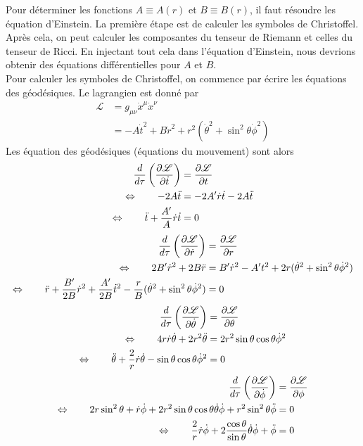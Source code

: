 \documentclass[a4paper,11pt]{report}
\theoremstyle{definition}
\theoremstyle{plain}
\theoremstyle{definition}
\theoremstyle{remark}
\renewcommand{\L}{\mathscr{L}}
\begin{document}
        Pour déterminer les fonctions $A\equiv A(r)$ et $B\equiv B(r)$, il faut résoudre les équation d'Einstein. La première étape est de calculer les symboles de Christoffel. Après cela, on peut calculer les composantes du tenseur de Riemann et celles du tenseur de Ricci. En injectant tout cela dans l'équation d'Einstein, nous devrions obtenir des équations différentielles pour $A$ et $B$.\\
        
        Pour calculer les symboles de Christoffel, on commence par écrire les équations des géodésiques. Le lagrangien est donné par
        \begin{align}
            \L &= g_{\mu\nu}\dot{x}^\mu\dot{x}^\nu \\
            &= -A\dot{t}^2+B\dot{r}^2+r^2(\dot{\theta}^2+\sin^2\theta\dot{\phi}^2)
        \end{align}
        Les équation des géodésiques (équations du mouvement) sont alors
        \begin{align}
            \frac{d}{d\tau}\left( \pdv{\L}{\dot{t}} \right) &= \pdv{\L}{t} \\
            \Leftrightarrow\qquad -2A \ddot{t} &= -2A'\dot{r}\dot{t}-2A\ddot{t}\\
            \Leftrightarrow\qquad \ddot{t}+\frac{A'}{A}\dot{r}\dot{t} &= 0
        \end{align}
        \begin{align}
            \frac{d}{d\tau}\left( \pdv{\L}{\dot{r}} \right) &= \pdv{\L}{r} \\
            \Leftrightarrow\qquad 2B'\dot{r}^2+2B\ddot{r} &= B'\dot{r}^2-A't^2+2r(\dot{\theta}^2+\sin^2\theta\dot{\phi}^2)\\
            \Leftrightarrow\qquad \ddot{r}+\frac{B'}{2B}\dot{r}^2+\frac{A'}{2B}\dot{t}^2-\frac{r}{B}(\dot{\theta}^2+\sin^2\theta\dot{\phi}^2) &= 0
        \end{align}
        \begin{align}
            \frac{d}{d\tau}\left( \pdv{\L}{\dot{\theta}} \right) &= \pdv{\L}{\theta} \\
            \Leftrightarrow\qquad 4r\dot{r}\dot{\theta}+2r^2\ddot{\theta}&=2r^2\sin\theta\cos\theta\dot{\phi}^2\\
            \Leftrightarrow\qquad \ddot{\theta}+\frac{2}{r}\dot{r}\dot{\theta}-\sin\theta\cos\theta\dot{\phi}^2 &= 0
        \end{align}
        \begin{align}
            \frac{d}{d\tau}\left( \pdv{\L}{\dot{\phi}} \right) &= \pdv{\L}{\phi} \\
            \Leftrightarrow\qquad 2r\sin^2\theta+\dot{r}\dot{\phi}+2r^2\sin\theta\cos\theta\dot{\theta}\dot{\phi}+r^2\sin^2\theta\ddot{\phi}&= 0\\
            \Leftrightarrow\qquad \frac{2}{r}\dot{r}\dot{\phi}+2\frac{\cos\theta}{\sin\theta}\dot\theta\dot{\phi}+\ddot{\phi} &= 0
        \end{align}
\end{document}
